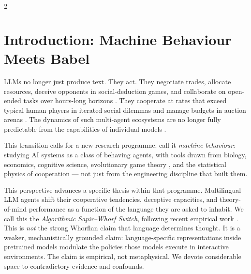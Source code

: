 \documentclass[openacc]{rsproca_new}
\begin{document}
\maketitle

\begin{multicols}{2}

\section{Introduction: Machine Behaviour Meets Babel}
\label{sec:intro}

LLMs no longer just produce text. They act. They negotiate trades, allocate resources, deceive opponents in social-deduction games, and collaborate on open-ended tasks over hours-long horizons \cite{meta2022cicero, wang2024voyager, huynh2026moreatstake, sun2025gametheoryllm}. They cooperate at rates that exceed typical human players in iterated social dilemmas \cite{fontana2024nicer} and manage budgets in auction arenas \cite{chen2024aucarena}. The dynamics of such multi-agent ecosystems are no longer fully predictable from the capabilities of individual models \cite{cemri2025mast, nie2025multiagentbench}.

This transition calls for a new research programme. \citeauthor{rahwan2019machinebehaviour} \cite{rahwan2019machinebehaviour} call it \emph{machine behaviour}: studying AI systems as a class of behaving agents, with tools drawn from biology, economics, cognitive science, evolutionary game theory \cite{han2022emergent}, and the statistical physics of cooperation \cite{perc2017statistical} --- not just from the engineering discipline that built them.

This perspective advances a specific thesis within that programme. Multilingual LLM agents shift their cooperative tendencies, deceptive capacities, and theory-of-mind performance as a function of the language they are asked to inhabit. We call this the \emph{Algorithmic Sapir--Whorf Switch}, following recent empirical work \cite{wang2025babel}. This is \emph{not} the strong Whorfian claim that language determines thought. It is a weaker, mechanistically grounded claim: language-specific representations inside pretrained models modulate the policies those models execute in interactive environments. The claim is empirical, not metaphysical. We devote considerable space to contradictory evidence and confounds.


\end{multicols}
\end{document}

